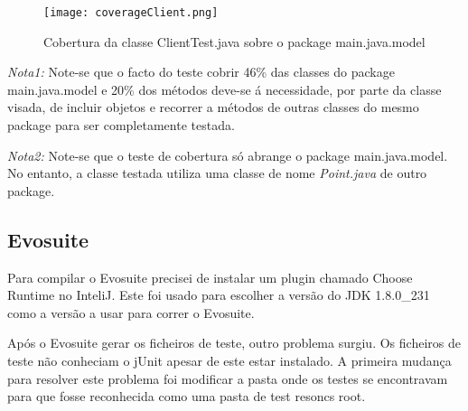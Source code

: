 \begin{figure}[H]

  \centering

  \texttt{[image: coverageClient.png]}

  \caption {Cobertura da classe ClientTest.java sobre o package main.java.model}

  \label {fig31}

\end{figure}

\par \textit{Nota1:} Note-se que o facto do teste cobrir 46\% das classes do package main.java.model e 20\% dos métodos deve-se á necessidade, por parte da classe visada, de incluir objetos e recorrer a métodos de outras classes do mesmo package para ser completamente testada.\newline
\par \textit{Nota2:} Note-se que o teste de cobertura só abrange o package main.java.model. No entanto, a classe testada utiliza uma classe de nome \textit{Point.java} de outro package.

\subsection{Evosuite}

\par Para compilar o Evosuite precisei de instalar um plugin chamado Choose Runtime no InteliJ. Este foi usado para escolher a versão do JDK 1.8.0\_231 como a versão a usar para correr o Evosuite.
\par Após o Evosuite gerar os ficheiros de teste, outro problema surgiu. Os ficheiros de teste não conheciam o jUnit apesar de este estar instalado. A primeira mudança para resolver este problema foi modificar a pasta onde os testes se encontravam para que fosse reconhecida como uma pasta de test resoncs root.























